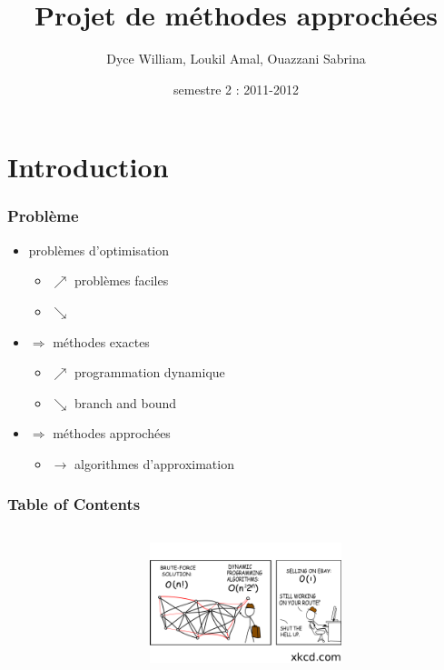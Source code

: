 \documentclass[french]{beamer}
\title{Projet de méthodes approchées}
\institute{M1 informatique UM2}
\author{Dyce William, Loukil Amal, Ouazzani Sabrina}
\date{semestre 2 : 2011-2012}
\begin{document}
\begin{frame}
  \titlepage
\end{frame}

\section{Introduction}

\begin{frame}
  \frametitle{Problème}
  \begin{itemize}
  \item problèmes d'optimisation 
    \begin{itemize}
    \item[] $\nearrow$ problèmes faciles
    \item[] $\searrow$ 
    \end{itemize}
  \item  $\Rightarrow$ méthodes exactes 
    \begin{itemize}
    \item[] $\nearrow$ programmation dynamique
    \item[] $\searrow$ branch and bound
    \end{itemize}

    
  \item  $\Rightarrow$ méthodes approchées
    \begin{itemize}
    \item[] $\longrightarrow$ algorithmes d'approximation
    \end{itemize}
  \end{itemize}
\end{frame}

\begin{frame}
  \frametitle{Table of Contents}
  \begin{columns}
    \begin{column}[]{5cm}
      \tableofcontents
    \end{column}
    \begin{column}[]{5cm}
      \begin{center}
        \includegraphics[height=3.5cm]{commerce.png}
      \end{center}
    \end{column}
  \end{columns}
\end{frame}
\end{document}
